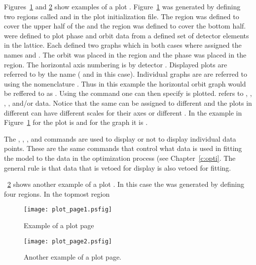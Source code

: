 Figures~\ref{f:plot_page1} and \ref{f:plot_page2} show examples
of a plot . Figure~\ref{f:plot_page1} was generated by
defining two regions called  and  in the plot 
initialization file. The  region was defined to cover the upper half
of the  and the  region was 
defined to cover the bottom half.  were defined to plot phase
and orbit data from a defined set of detector elements in the lattice. Each 
 defined two graphs which in both cases where assigned the
names  and . The orbit
 was placed in the  region and the phase 
was placed in the  region. The horizontal axis numbering 
is by detector .
Displayed plots are referred to by the  name ( and  in
this case). Individual graphs are are referred to using the nomenclature 
. Thus in this example the horizontal orbit graph
would be reffered to as . 
Using the  command one can then specify  is
plotted.  refers to , , ,
, and/or  data.  Notice that the same  can be assigned to different  and the plots in different
 can have different scales for their axes or different
. In the example in Figure~\ref{f:plot_page1}  for the 
plot is  and for the  graph it is . 

The , , ,
and  commands are used to display or not to display
individual data points. These are the same commands that control what
data is used in fitting the model to the data in the optimization process
(see Chapter~\ref{c:opti}. The general rule is
that data that is vetoed for display is also vetoed for fitting.

\Figure~\ref{f:plot_page2} shows another example of a plot .
In this case the  was generated by defining four regions.
In the topmost region


\begin{figure}
  \centering
  \texttt{[image: plot\_page1.psfig]}
  \caption{Example of a plot page}
  \label{f:plot_page1}
\end{figure}

\begin{figure}
  \centering
  \texttt{[image: plot\_page2.psfig]}
  \caption{Another example of a plot page.}
  \label{f:plot_page2}
\end{figure}

